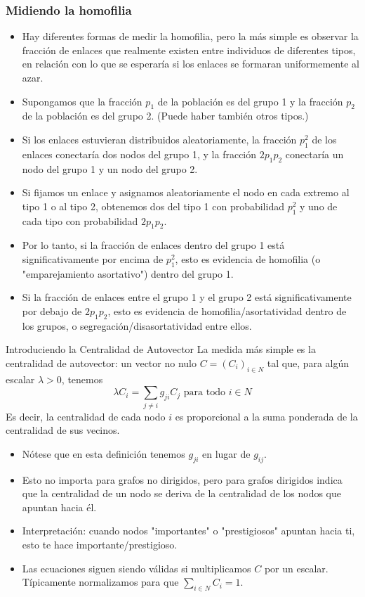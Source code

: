 \documentclass[11pt]{beamer}
\begin{document}
\begin{frame}[allowframebreaks]
\frametitle{Midiendo la homofilia}
\begin{itemize}
    \item Hay diferentes formas de medir la homofilia, pero la más simple es observar la fracción de enlaces que realmente existen entre individuos de diferentes tipos, en relación con lo que se esperaría si los enlaces se formaran uniformemente al azar.
    \item Supongamos que la fracción $p_{1}$ de la población es del grupo 1 y la fracción $p_{2}$ de la población es del grupo 2. (Puede haber también otros tipos.)
    \item Si los enlaces estuvieran distribuidos aleatoriamente, la fracción $p_{1}^{2}$ de los enlaces conectaría dos nodos del grupo 1, y la fracción $2 p_{1} p_{2}$ conectaría un nodo del grupo 1 y un nodo del grupo 2.
    \item Si fijamos un enlace y asignamos aleatoriamente el nodo en cada extremo al tipo 1 o al tipo 2, obtenemos dos del tipo 1 con probabilidad $p_{1}^{2}$ y uno de cada tipo con probabilidad $2 p_{1} p_{2}$.
    \item Por lo tanto, si la fracción de enlaces dentro del grupo 1 está significativamente por encima de $p_{1}^{2}$, esto es evidencia de homofilia (o "emparejamiento asortativo") dentro del grupo 1.
    \item Si la fracción de enlaces entre el grupo 1 y el grupo 2 está significativamente por debajo de $2 p_{1} p_{2}$, esto es evidencia de homofilia/asortatividad dentro de los grupos, o segregación/disasortatividad entre ellos.
\end{itemize}
\end{frame}

\begin{frame}{Introduciendo la Centralidad de Autovector}
La medida más simple es la centralidad de autovector: un vector no nulo $C=\left(C_{i}\right)_{i \in N}$ tal que, para algún escalar $\lambda>0$, tenemos
$$
\lambda C_{i}=\sum_{j \neq i} g_{j i} C_{j} \text { para todo } i \in N
$$
Es decir, la centralidad de cada nodo $i$ es proporcional a la suma ponderada de la centralidad de sus vecinos.
\begin{itemize}
\item Nótese que en esta definición tenemos $g_{j i}$ en lugar de $g_{i j}$.
\item Esto no importa para grafos no dirigidos, pero para grafos dirigidos indica que la centralidad de un nodo se deriva de la centralidad de los nodos que apuntan hacia él.
\item Interpretación: cuando nodos "importantes" o "prestigiosos" apuntan hacia ti, esto te hace importante/prestigioso.
\item Las ecuaciones siguen siendo válidas si multiplicamos $C$ por un escalar. Típicamente normalizamos para que $\sum_{i \in N} C_{i}=1$.
\end{itemize}
\end{frame}
\end{document}
